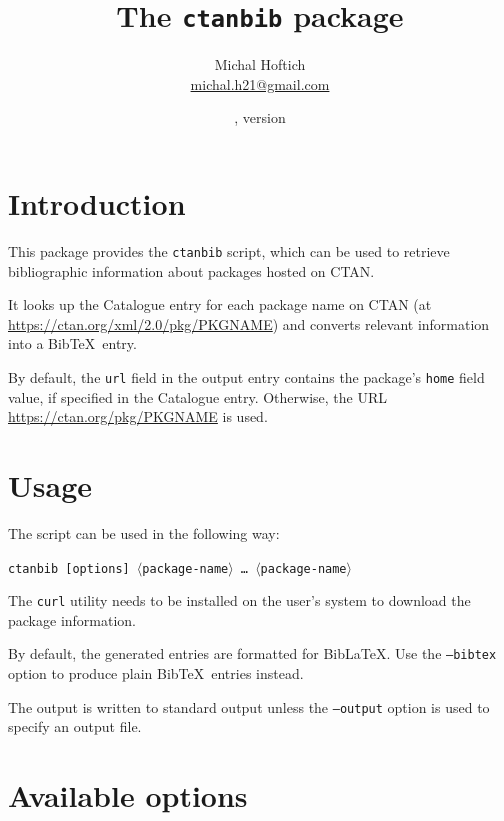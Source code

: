 \documentclass[11pt]{ltxdoc}
\title{The \texttt{ctanbib} package}
\author{Michal Hoftich\\\href{mailto:michal.h21@gmail.com}{michal.h21@gmail.com}}
\date{\gitdate, version \gitversion}
\newcommand\package[1]{\texttt{#1}}
\begin{document}
\maketitle

\section{Introduction}

This package provides the \package{ctanbib} script, which can be used to
retrieve bibliographic information about packages hosted on CTAN.

It looks up the Catalogue entry for each package name on CTAN (at
\url{https://ctan.org/xml/2.0/pkg/PKGNAME}) and converts relevant information
into a Bib\TeX\ entry.

By default, the \texttt{url} field in the output entry contains the package's
\texttt{home} field value, if specified in the Catalogue entry. Otherwise,
the URL \url{https://ctan.org/pkg/PKGNAME} is used.

\section{Usage}

The script can be used in the following way:

\medskip

\noindent\package{ctanbib [options] $\langle$package-name$\rangle$ \ldots\ $\langle$package-name$\rangle$}

\medskip

The \texttt{curl} utility needs to be installed on the user's system to
download the package information.

By default, the generated entries are formatted for Bib\LaTeX. Use the
\texttt{--bibtex} option to produce plain Bib\TeX\ entries instead.

The output is written to standard output unless the \texttt{--output}
option is used to specify an output file.

\section{Available options}
\end{document}
